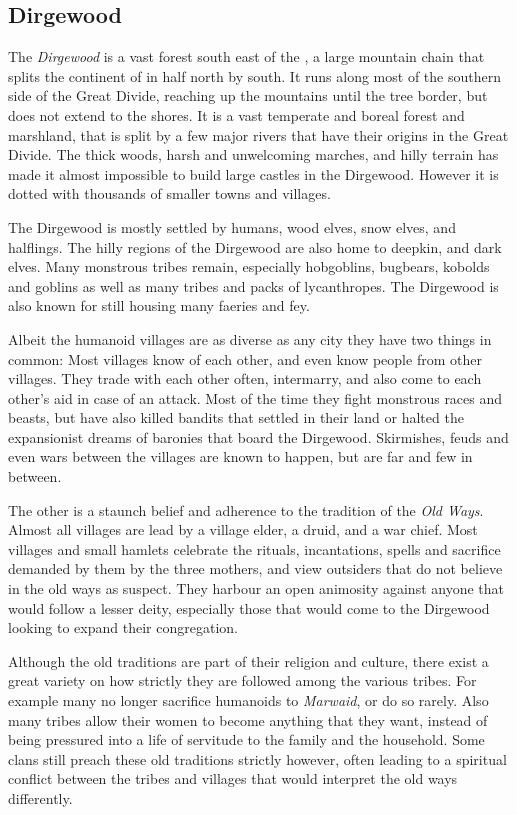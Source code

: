 \subsection{Dirgewood}
\label{sec:Dirgewood}

The \emph{Dirgewood} is a vast forest south east of the , a large mountain chain that splits the continent of
 in half north by south. It runs along most of the
southern side of the Great Divide, reaching up the mountains until the tree
border, but does not extend to the shores. It is a vast temperate and boreal
forest and marshland, that is split by a few major rivers that have their
origins in the Great Divide. The thick woods, harsh and unwelcoming marches,
and hilly terrain has made it almost impossible to build large castles in the
Dirgewood. However it is dotted with thousands of smaller towns and villages.

The Dirgewood is mostly settled by humans, wood elves, snow elves, and
halflings. The hilly regions of the Dirgewood are also home to deepkin, and
dark elves. Many monstrous tribes remain, especially hobgoblins, bugbears,
kobolds and goblins as well as many tribes and packs of lycanthropes. The
Dirgewood is also known for still housing many faeries and fey.

Albeit the humanoid villages are as diverse as any city they have two things
in common: Most villages know of each other, and even know people from other
villages. They trade with each other often, intermarry, and also come to each
other's aid in case of an attack. Most of the time they fight monstrous races
and beasts, but have also killed bandits that settled in their land or halted
the expansionist dreams of baronies that board the Dirgewood. Skirmishes,
feuds and even wars between the villages are known to happen, but are far and
few in between.

The other is a staunch belief and adherence to the tradition of the
\emph{Old Ways}. Almost all villages are lead by a village elder, a druid, and
a war chief. Most villages and small hamlets celebrate the rituals,
incantations, spells and sacrifice demanded by them by the three mothers, and
view outsiders that do not believe in the old ways as suspect. They harbour an
open animosity against anyone that would follow a lesser deity, especially
those that would come to the Dirgewood looking to expand their congregation.

Although the old traditions are part of their religion and culture, there exist
a great variety on how strictly they are followed among the various tribes.
For example many no longer sacrifice humanoids to \emph{Marwaid}, or do so
rarely. Also many tribes allow their women to become anything that they want,
instead of being pressured into a life of servitude to the family and the
household. Some clans still preach these old traditions strictly however,
often leading to a spiritual conflict between the tribes and villages that
would interpret the old ways differently.

